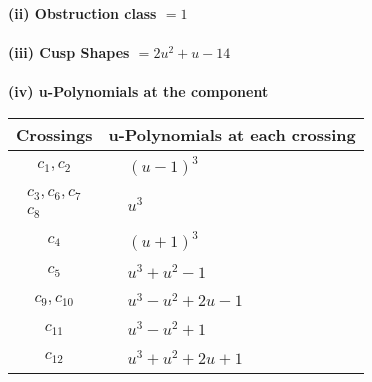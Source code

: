 \documentclass[1p]{elsarticle_modified}
\theoremstyle{definition}
\begin{document}
\flushleft \textbf{(ii) Obstruction class $= 1$}\\~\\
\flushleft \textbf{(iii) Cusp Shapes $= 2 u^2+u-14$}\\~\\
\newpage\renewcommand{\arraystretch}{1}
\flushleft \textbf{(iv) u-Polynomials at the component}\newline \\
\begin{tabular}{m{50pt}|m{274pt}}
Crossings & \hspace{64pt}u-Polynomials at each crossing \\
\hline $$\begin{aligned}c_{1},c_{2}\end{aligned}$$&$\begin{aligned}
&(u-1)^3
\end{aligned}$\\
\hline $$\begin{aligned}c_{3},c_{6},c_{7}\\c_{8}\end{aligned}$$&$\begin{aligned}
&u^3
\end{aligned}$\\
\hline $$\begin{aligned}c_{4}\end{aligned}$$&$\begin{aligned}
&(u+1)^3
\end{aligned}$\\
\hline $$\begin{aligned}c_{5}\end{aligned}$$&$\begin{aligned}
&u^3+u^2-1
\end{aligned}$\\
\hline $$\begin{aligned}c_{9},c_{10}\end{aligned}$$&$\begin{aligned}
&u^3- u^2+2 u-1
\end{aligned}$\\
\hline $$\begin{aligned}c_{11}\end{aligned}$$&$\begin{aligned}
&u^3- u^2+1
\end{aligned}$\\
\hline $$\begin{aligned}c_{12}\end{aligned}$$&$\begin{aligned}
&u^3+u^2+2 u+1
\end{aligned}$\\
\hline
\end{tabular}\\~\\
\end{document}
